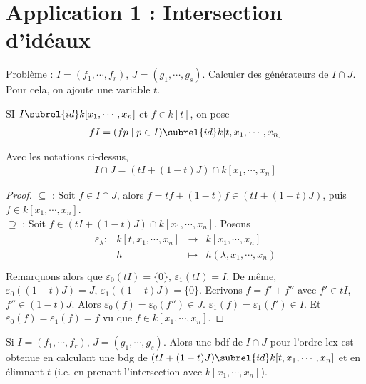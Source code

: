     \section{Application 1 : Intersection d'idéaux}
        Problème : $I = (f_1, \cdots, f_r)$, $J = (g_1, \cdots, g_s)$. Calculer des générateurs de $I \cap J$. Pour cela, on ajoute une variable $t$. 
        \begin{nota}
            SI $I \subrel{id} k[x_1, \cdots, x_n]$ et $f \in k[t]$, on pose
            \begin{align*}
                fI = (fp \mid p \in I) \subrel{id} k[t, x_1, \cdots, x_n]
            \end{align*}
        \end{nota}
        \begin{theo}
            Avec les notations ci-dessus,
            \begin{align*}
                I \cap J = (tI + (1 - t)J) \cap k[x_1, \cdots, x_n]
            \end{align*}
        \end{theo}
        \begin{proof}
            $\subseteq$ : Soit $f \in I \cap J$, alors $f = tf + (1 - t)f \in (tI + (1 - t)J)$, puis $f \in k[x_1, \cdots, x_n]$. \\
            $\supseteq$ : Soit $f \in (tI + (1-t)J) \cap k[x_1, \cdots, x_n]$. Posons
            \begin{align*}
                \begin{array}{cccc}
                    \varepsilon_\lambda : & k[t,x_1, \cdots, x_n] & \to & k[x_1, \cdots, x_n] \\
                    & h & \mapsto & h(\lambda, x_1, \cdots, x_n) \\
                \end{array}
            \end{align*}
            Remarquons alors que $\varepsilon_0(tI) = \{0\}$, $\varepsilon_1(tI) = I$. De même, $\varepsilon_0((1-t)J) = J$, $\varepsilon_1((1-t)J) = \{0\}$. Ecrivons $f = f' + f''$ avec $f' \in tI$, $f'' \in (1 - t)J$. Alors $\varepsilon_0(f) = \varepsilon_0(f'') \in J$. $\varepsilon_1(f) = \varepsilon_1(f') \in I$. Et $\varepsilon_0(f) = \varepsilon_1(f) = f$ vu que $f \in k[x_1, \cdots, x_n]$.
        \end{proof}
        \begin{coro}
            Si $I = (f_1, \cdots, f_r)$, $J = (g_1, \cdots, g_s)$. Alors une bdf de $I \cap J$ pour l'ordre lex est obtenue en calculant une bdg de $(tI + (1 - t)J) \subrel{id} k[t, x_1, \cdots, x_n]$ et en élimnant $t$ (i.e. en prenant l'intersection avec $k[x_1, \cdots, x_n]$).
        \end{coro}
        

